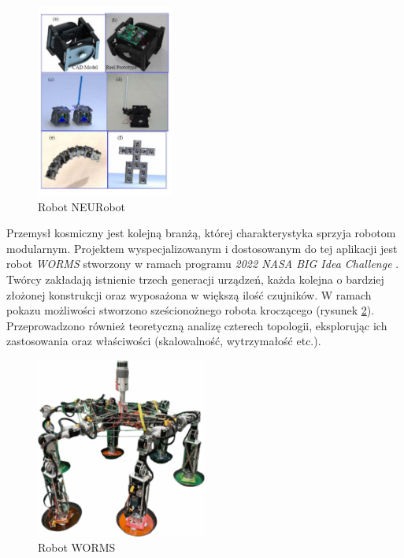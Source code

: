 \begin{figure}[ht!]
    \centering
    \includegraphics[width=0.4\textwidth]{rysunki/robots/neurobot.pdf}
    \caption{\label{fig: neurobot}Robot NEURobot \cite{fang2009}}
\end{figure} 

Przemysł kosmiczny jest kolejną branżą, której charakterystyka sprzyja robotom modularnym. Projektem wyspecjalizowanym i dostosowanym do tej aplikacji jest robot \textit{WORMS} stworzony w ramach programu \textit{2022 NASA BIG Idea Challenge} \cite{lordos2023}. Twórcy zakładają istnienie trzech generacji urządzeń, każda kolejna o bardziej złożonej konstrukcji oraz wyposażona w większą ilość czujników. W ramach pokazu możliwości stworzono sześcionożnego robota kroczącego (rysunek \ref{fig: worms}). Przeprowadzono również teoretyczną analizę czterech topologii, eksplorując ich zastosowania oraz właściwości (skalowalność, wytrzymałość etc.).

\begin{figure}[ht!]
    \centering
    \includegraphics[width=0.5\textwidth]{rysunki/robots/worms.pdf}
    \caption{\label{fig: worms}Robot WORMS \cite{lordos2023}}
\end{figure} 


